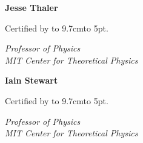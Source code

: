 %
%


\NewDocumentCommand{}

\NewDocumentCommand{}

\newcommand{\hruledotted}[2]{
\begin{flushleft}
    {\Large #1 by} \hbox to #2{\leaders\hbox to 5pt{\hss . \hss}\hfil}
\end{flushleft}
}

\begin{flushright}



\vspace{10pt}

\textbf{Jesse Thaler}
\vspace{-18pt}
\hruledotted{Certified}{9.7cm}
\vspace{-5pt}
{\itshape
Professor of Physics
\\
MIT Center for Theoretical Physics
}%
\end{flushright}

\begin{flushright}

\vspace{10pt}

\textbf{Iain Stewart}
\vspace{-18pt}
\hruledotted{Certified}{9.7cm}
\vspace{-5pt}
{\itshape
Professor of Physics
\\
MIT Center for Theoretical Physics
\\[18pt]
}
\end{flushright}

